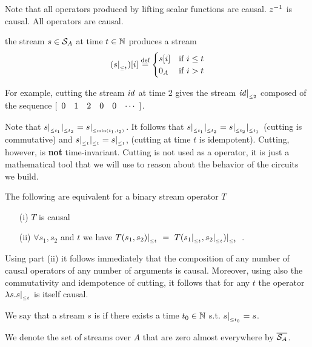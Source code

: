 Note that all operators produced by lifting scalar functions are causal.
$z^{-1}$ is causal.  All \dbsp operators are causal.

\begin{definition}[Cutting]
 the stream $s \in \mathcal{S}_{A}$ at time $t \in \mathbb{N}$ produces a stream
$$
(s|_{_{\leq t}})[i] \stackrel{\textrm{\scriptsize def}}{=}  \begin{cases}
                      s[i] &\text{if}~i\leq t\\
                      0_A  &\text{if}~i>t
                      \end{cases}
$$
\end{definition}
For example, cutting the stream $\mathit{id}$ at time 2 gives the stream $\mathit{id}|_{_{\leq 2}}$
composed of the sequence $\sv{0 1 2 0 0}$.

Note that $s|_{_{\leq t_1}}|_{_{\leq t_2}}=s|_{_{\leq \min(t_1,t_2)}}$. It follows that
$s|_{_{\leq t_1}}|_{_{\leq t_2}}=s|_{_{\leq t_2}}|_{_{\leq t_1}}$ (cutting is commutative) and
$s|_{_{\leq t}}|_{_{\leq t}}=s|_{_{\leq t}}$, (cutting at time $t$ is idempotent).
Cutting, however, is \textbf{not} time-invariant.  Cutting is not
used as a \dbsp operator, it is just a mathematical tool that we will use to
reason about the behavior of the circuits we build.

\begin{lemma}
\label{lemma-causal-characterization}
The following are equivalent for a binary stream operator $T$
\begin{enumerate}
\item[(i)] $T$ is causal
\item[(ii)] $\forall s_1,s_2$ and $t$  we have $T(s_1,s_2)|_{_{\leq t}} ~=~ T(s_1|_{_{\leq t}},s_2|_{_{\leq t}})|_{_{\leq t}}$~.
\end{enumerate}
\end{lemma}
Using part (ii) it follows immediately that the composition
of any number of causal operators of any number of arguments is causal.
Moreover, using also the commutativity and idempotence of cutting, it follows that
for any $t$ the operator $\lambda s.s|_{_{\leq t}}$ is itself causal.

\begin{definition}\label{def:zae}
We say that a stream $s$ is  if there exists a time $t_0 \in \mathbb{N}$
s.t. $s|_{_{\leq t_0}} = s$.
\end{definition}

We denote the set of streams over $A$ that are zero almost everywhere
by $\overline{\mathcal{S}_{A}}$.

